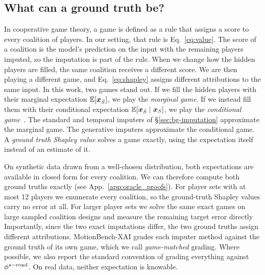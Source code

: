 \subsection{What can a ground truth be?}
\label{sec:bg-gt}
In cooperative game theory, a game is defined as a rule that assigns a score to every coalition of players. In our setting, that rule is Eq.~\ref{eq:value}. The score of a coalition is the model's prediction on the input with the remaining players imputed, so the imputation is part of the rule. When we change how the hidden players are filled, the same
coalition receives a different score. We are then playing a different game, and Eq.~\ref{eq:shapley} assigns different attributions to the same input. In this work, two games stand out. If we fill the hidden players with their marginal expectation $\mathbb{E}[\bm{x}_{\bar{S}}]$, we play the \emph{marginal game}. If we instead fill them with their conditional expectation $\mathbb{E}[\bm{x}_{\bar{S}} \mid \bm{x}_{S}]$, we play the \emph{conditional game}~\citep{janzing2020feature,chen2020true}. The standard and temporal imputers of \S\ref{sec:bg-imputation} approximate the marginal game. The generative imputers approximate the conditional game. A \textit{ground truth Shapley value} solves a game exactly, using the expectation itself instead of an estimate of it. 


On synthetic data drawn from a well-chosen distribution, both expectations are available in closed form for every coalition. We can therefore compute both ground truths exactly (see App.~\ref{app:oracle_proofs}). For player sets with at most 12 players we enumerate every coalition, so the ground-truth Shapley values carry no error at all. For larger player sets we solve the same exact games on large sampled coalition designs and measure the remaining target error directly Importantly, since the two exact imputations differ, the two ground truths assign different attributions. MotionBench-XAI grades each imputer method against the ground truth of its own game, which we call \emph{game-matched} grading. Where possible, we also report the standard convention of grading everything against $\phi^{\star\mathrm{-cond}}$. On real data, neither expectation is knowable. 

